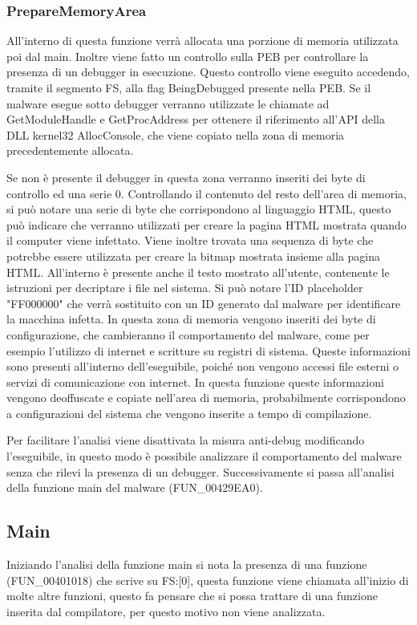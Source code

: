 \documentclass[a4paper,12pt]{article}
\begin{document}
\subsubsection{PrepareMemoryArea}
All'interno di questa funzione verrà allocata una porzione di memoria utilizzata poi dal main. Inoltre viene fatto un controllo sulla PEB per controllare la presenza di un debugger in esecuzione. Questo controllo viene eseguito accedendo, tramite il segmento FS, alla flag BeingDebugged presente nella PEB. Se il malware esegue sotto debugger verranno utilizzate le chiamate ad GetModuleHandle e GetProcAddress per ottenere il riferimento all'API della DLL kernel32 AllocConsole, che viene copiato nella zona di memoria precedentemente allocata. 

Se non è presente il debugger in questa zona verranno inseriti dei byte di controllo ed una serie 0. Controllando il contenuto del resto dell'area di memoria, si può notare una serie di byte che corrispondono al linguaggio HTML, questo può indicare che verranno utilizzati per creare la pagina HTML mostrata quando il computer viene infettato. Viene inoltre trovata una sequenza di byte che potrebbe essere utilizzata per creare la bitmap mostrata insieme alla pagina HTML. All'interno è presente anche il testo mostrato all'utente, contenente le istruzioni per decriptare i file nel sistema. Si può notare l'ID placeholder "FF000000" che verrà sostituito con un ID generato dal malware per identificare la macchina infetta. 
In questa zona di memoria vengono inseriti dei byte di configurazione, che cambieranno il comportamento del malware, come per esempio l'utilizzo di internet e scritture su registri di sistema.  Queste informazioni sono presenti all'interno dell'eseguibile, poiché non vengono accessi file esterni o servizi di comunicazione con internet. In questa funzione queste informazioni vengono deoffuscate e copiate nell'area di memoria, probabilmente corrispondono a configurazioni del sistema che vengono inserite a tempo di compilazione. 

Per facilitare l'analisi viene disattivata la misura anti-debug modificando l'eseguibile, in questo modo è possibile analizzare il comportamento del malware senza che rilevi la presenza di un debugger. 
Successivamente si passa all'analisi della funzione main del malware (FUN\_00429EA0).

\subsection{Main}
Iniziando l'analisi della funzione main si nota la presenza di una funzione (FUN\_00401018) che scrive su FS:[0], questa funzione viene chiamata all'inizio di molte altre funzioni, questo fa pensare che si possa trattare di una funzione inserita dal compilatore, per questo motivo non viene analizzata.
\end{document}
